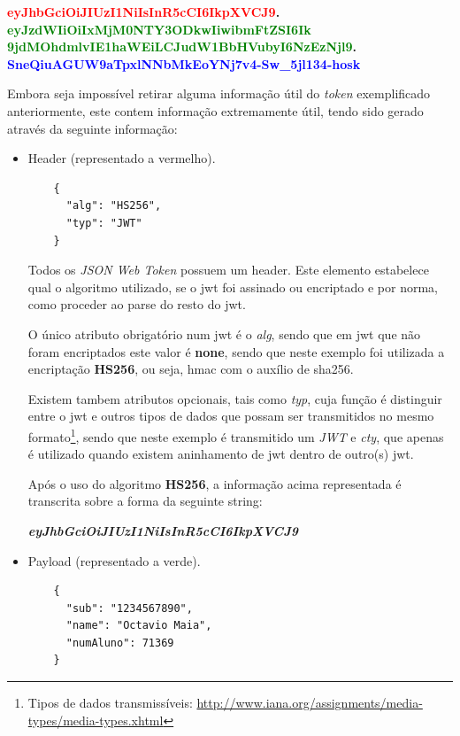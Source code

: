 \begin{center}
    \textbf{\textcolor{red}{eyJhbGciOiJIUzI1NiIsInR5cCI6IkpXVCJ9}.\\
    \textcolor{green}{eyJzdWIiOiIxMjM0NTY3ODkwIiwibmFtZSI6Ik\\9jdMOhdmlvIE1haWEiLCJudW1BbHVubyI6NzEzNjl9}.\\
    \textcolor{blue}{SneQiuAGUW9aTpxlNNbMkEoYNj7v4-Sw\_5jl134-hosk}}
\end{center}

Embora seja impossível retirar alguma informação útil do \emph{token} exemplificado anteriormente, este contem informação extremamente útil, tendo sido gerado através da seguinte informação:

\begin{itemize}
    \item Header (representado a vermelho).
    \begin{verbatim}
    {
      "alg": "HS256",
      "typ": "JWT"
    }
    \end{verbatim}
    
    Todos os \emph{JSON Web Token} possuem um header. Este elemento estabelece qual o algoritmo utilizado, se o \gls{jwt} foi assinado ou encriptado e por norma, como proceder ao parse do resto do \gls{jwt}.
    
    O único atributo obrigatório num \gls{jwt} é o \emph{alg}, sendo que em \gls{jwt} que não foram encriptados este valor é \textbf{none}, sendo que neste exemplo foi utilizada a encriptação \textbf{HS256}, ou seja, \gls{hmac} com o auxílio de \gls{sha256}.
    
    Existem tambem atributos opcionais, tais como \emph{typ}, cuja função é distinguir entre o \gls{jwt} e outros tipos de dados que possam ser transmitidos no mesmo formato\footnote{Tipos de dados transmissíveis: \url{http://www.iana.org/assignments/media-types/media-types.xhtml}}, sendo que neste exemplo é transmitido um \emph{JWT} e \emph{cty}, que apenas é utilizado quando existem aninhamento de \gls{jwt} dentro de outro(s) \gls{jwt}.
    
    Após o uso do algoritmo \textbf{HS256}, a informação acima representada é transcrita sobre a forma da seguinte string:
    
    \begin{center}
        \textbf{\emph{eyJhbGciOiJIUzI1NiIsInR5cCI6IkpXVCJ9}}
    \end{center}
    
    \newpage
    \item Payload (representado a verde).
    \begin{verbatim}
    {
      "sub": "1234567890",
      "name": "Octavio Maia",
      "numAluno": 71369
    }
    \end{verbatim}
    

\end{itemize}
